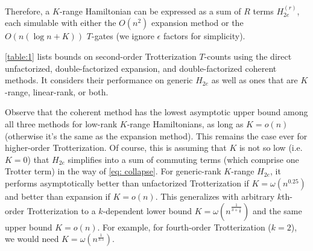 Therefore, a $K$-range Hamiltonian can be expressed as a sum of $R$ terms $H_{2e}^{(r)}$, each simulable with either the $O(n^2)$ expansion method or the $O(n(\log{n} + K))$ $T$-gates (we ignore $\epsilon$ factors for simplicity).

\ref{table:1} lists bounds on second-order Trotterization $T$-counts using the direct unfactorized, double-factorized expansion, and double-factorized coherent methods. It considers their performance on generic $H_{2e}$ as well as ones that are $K$-range, linear-rank, or both.

Observe that the coherent method has the lowest asymptotic upper bound among all three methods for low-rank $K$-range Hamiltonians, as long as $K = o(n)$ (otherwise it's the same as the expansion method). This remains the case ever for higher-order Trotterization. Of course, this is assuming that $K$ is not so low (i.e. $K = 0$) that $H_{2e}$ simplifies into a sum of commuting terms (which comprise one Trotter term) in the way of \eqref{eq: collapse}.
For generic-rank $K$-range $H_{2e}$, it performs asymptotically better than unfactorized Trotterization if $K = \omega(n^{0.25})$ and better than expansion if $K = o(n)$. This generalizes with arbitrary $k$th-order Trotterization to a $k$-dependent lower bound $K = \omega(n^{\frac{1}{3 + \frac{1}{k}}})$ and the same upper bound $K = o(n)$. For example, for fourth-order Trotterization ($k = 2$), we would need $K = \omega(n^{\frac{1}{3.5}})$.

